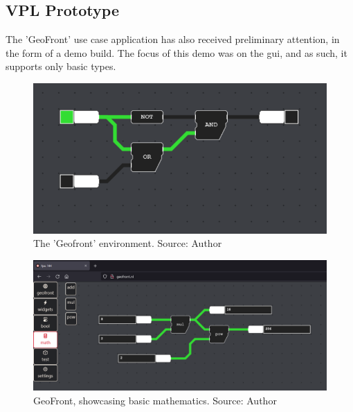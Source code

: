 \subsection{VPL Prototype}
\label{sec:preliminary-vpl}

The 'GeoFront' use case application has also received preliminary attention, in the form of a demo build. The focus of this demo was on the \ac{gui}, and as such, it supports only basic types. 

\begin{figure}[!tbp]
  \centering
  \begin{minipage}[b]{1.0\textwidth}
    \includegraphics[width=\textwidth]{../images/geofront-1.PNG}
    \caption{The 'Geofront' environment. Source: Author}
    \label{fig:geofront-1}
  \end{minipage}
\end{figure}


\begin{figure}[!tbp]
  \centering
  \begin{minipage}[b]{1.0\textwidth}
    \includegraphics[width=\textwidth]{../images/geofront-2.PNG}
    \caption{GeoFront, showcasing basic mathematics. Source: Author}
    \label{fig:geofront-2}
  \end{minipage}
\end{figure}


